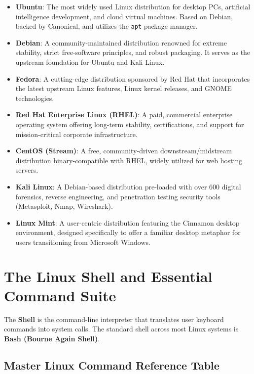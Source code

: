\begin{itemize}[leftmargin=1.5em]
    \item \textbf{Ubuntu}: The most widely used Linux distribution for desktop PCs, artificial intelligence development, and cloud virtual machines. Based on Debian, backed by Canonical, and utilizes the \texttt{apt} package manager.
    \item \textbf{Debian}: A community-maintained distribution renowned for extreme stability, strict free-software principles, and robust packaging. It serves as the upstream foundation for Ubuntu and Kali Linux.
    \item \textbf{Fedora}: A cutting-edge distribution sponsored by Red Hat that incorporates the latest upstream Linux features, Linux kernel releases, and GNOME technologies.
    \item \textbf{Red Hat Enterprise Linux (RHEL)}: A paid, commercial enterprise operating system offering long-term stability, certifications, and support for mission-critical corporate infrastructure.
    \item \textbf{CentOS (Stream)}: A free, community-driven downstream/midstream distribution binary-compatible with RHEL, widely utilized for web hosting servers.
    \item \textbf{Kali Linux}: A Debian-based distribution pre-loaded with over 600 digital forensics, reverse engineering, and penetration testing security tools (Metasploit, Nmap, Wireshark).
    \item \textbf{Linux Mint}: A user-centric distribution featuring the Cinnamon desktop environment, designed specifically to offer a familiar desktop metaphor for users transitioning from Microsoft Windows.
\end{itemize}

\section{The Linux Shell and Essential Command Suite}

The \textbf{Shell} is the command-line interpreter that translates user keyboard commands into system calls. The standard shell across most Linux systems is \textbf{Bash (Bourne Again Shell)}.

\subsection{Master Linux Command Reference Table}

